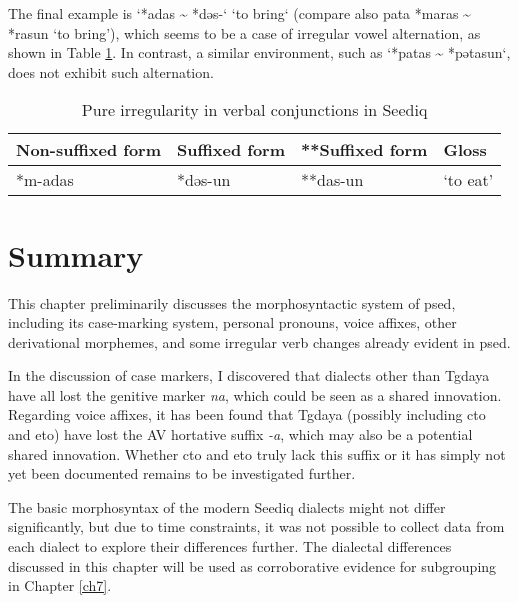 The final example is `*adas \~{} *dəs-` `to bring` (compare also \acl{pata} *maras \~{} *rasun `to bring'), which seems to be a case of irregular vowel alternation, as shown in Table \ref{tab:psed_v_irr}. In contrast, a similar environment, such as `*patas \~{} *pətasun`, does not exhibit such alternation.

\begin{table}[!htbp]
\centering
\caption{Pure irregularity in verbal conjunctions in Seediq}
\label{tab:psed_v_irr}
\begin{tabular}{llll}
\hline
Non-suffixed form & Suffixed form & **Suffixed form & Gloss     \\ \hline
*m-adas           & *dəs-un       & **das-un        & `to eat'  \\ \hline
\end{tabular}
\end{table}

\section{Summary}




This chapter preliminarily discusses the morphosyntactic system of \acl{psed}, including its case-marking system, personal pronouns, voice affixes, other derivational morphemes, and some irregular verb changes already evident in \acl{psed}.

In the discussion of case markers, I discovered that dialects other than Tgdaya have all lost the genitive marker \textit{na}, which could be seen as a shared innovation. Regarding voice affixes, it has been found that Tgdaya (possibly including \acl{cto} and \acl{eto}) have lost the AV hortative suffix \textit{-a}, which may also be a potential shared innovation. Whether \acl{cto} and \acl{eto} truly lack this suffix or it has simply not yet been documented remains to be investigated further.

The basic morphosyntax of the modern Seediq dialects might not differ significantly, but due to time constraints, it was not possible to collect data from each dialect to explore their differences further. The dialectal differences discussed in this chapter will be used as corroborative evidence for subgrouping in Chapter \ref{ch7}.